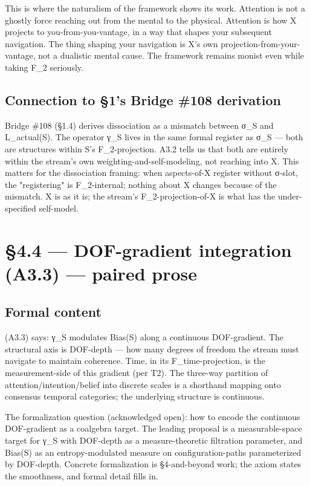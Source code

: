 \documentclass[11pt, openany]{book}
\newcommand{\sectionbreak}{\clearpage}
\begin{document}
This is where the naturalism of the framework shows its work. Attention is not a ghostly force reaching out from the mental to the physical. Attention is how X projects to you-from-you-vantage, in a way that shapes your subsequent navigation. The thing shaping your navigation is X's own projection-from-your-vantage, not a dualistic mental cause. The framework remains monist even while taking F\_\allowbreak{}2 seriously.

\subsection{Connection to §1's Bridge \#108 derivation}

Bridge \#108 (§1.4) derives dissociation as a mismatch between σ\_\allowbreak{}S and L\_\allowbreak{}actual(S). The operator γ\_\allowbreak{}S lives in the same formal register as σ\_\allowbreak{}S --- both are structures within S's F\_\allowbreak{}2-projection. A3.2 tells us that both are entirely within the stream's own weighting-and-self-modeling, not reaching into X. This matters for the dissociation framing: when aspects-of-X register without σ-slot, the "registering" is F\_\allowbreak{}2-internal; nothing about X changes because of the mismatch. X is as it is; the stream's F\_\allowbreak{}2-projection-of-X is what has the under-specified self-model.

\sectionbreak

\section{§4.4 --- DOF-gradient integration (A3.3) --- paired prose}

\subsection{Formal content}

(A3.3) says: γ\_\allowbreak{}S modulates Bias(S) along a continuous DOF-gradient. The structural axis is DOF-depth --- how many degrees of freedom the stream must navigate to maintain coherence. Time, in its F\_\allowbreak{}time-projection, is the measurement-side of this gradient (per T2). The three-way partition of attention/intention/belief into discrete scales is a shorthand mapping onto consensus temporal categories; the underlying structure is continuous.

The formalization question (acknowledged open): how to encode the continuous DOF-gradient as a coalgebra target. The leading proposal is a measurable-space target for γ\_\allowbreak{}S with DOF-depth as a measure-theoretic filtration parameter, and Bias(S) as an entropy-modulated measure on configuration-paths parameterized by DOF-depth. Concrete formalization is §4-and-beyond work; the axiom states the smoothness, and formal detail fills in.
\end{document}
